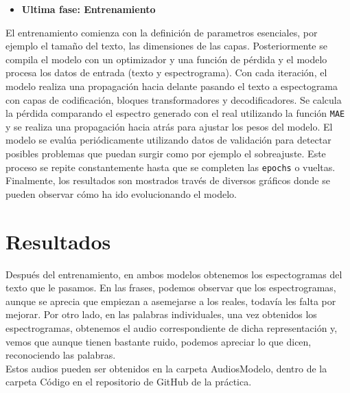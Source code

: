 \documentclass{article}
\begin{document}
\begin{Large}
\vspace{1cm}
\begin{itemize}
    \item \textbf{Ultima fase: Entrenamiento}     
\end{itemize}
El entrenamiento comienza con la definición de parametros esenciales, por ejemplo el tamaño del texto, las dimensiones de las capas. Posteriormente se compila el modelo con un optimizador y una función de pérdida y el modelo procesa los datos de entrada (texto y espectrograma). Con cada iteración, el modelo realiza una propagación hacia delante pasando el texto a espectograma con capas de codificación, bloques transformadores y decodificadores. Se calcula la pérdida comparando el espectro generado con el real utilizando la función \texttt{MAE} y se realiza una propagación hacia atrás para ajustar los pesos del modelo. El modelo se evalúa periódicamente utilizando datos de validación para detectar posibles problemas que puedan surgir como por ejemplo el sobreajuste. Este proceso se repite constantemente hasta que se completen las \texttt{epochs} o vueltas. Finalmente, los resultados son mostrados través de diversos gráficos donde se pueden observar cómo ha ido evolucionando el modelo.
\end{Large}


\vspace{2cm}
\section{\Huge Resultados}
\begin{Large}
\vspace{0.5cm}
Después del entrenamiento, en ambos modelos obtenemos los espectogramas del texto que le pasamos. En las frases, podemos observar que los espectrogramas, aunque se aprecia que empiezan a asemejarse a los reales, todavía les falta por mejorar. Por otro lado, en las palabras individuales, una vez obtenidos los espectrogramas, obtenemos el audio correspondiente de dicha representación y, vemos que aunque tienen bastante ruido, podemos apreciar lo que dicen, reconociendo las palabras.\\

Estos audios pueden ser obtenidos en la carpeta AudiosModelo, dentro de la carpeta Código en el repositorio de GitHub de la práctica.

\end{Large}
\vspace{2cm}
\end{document}
